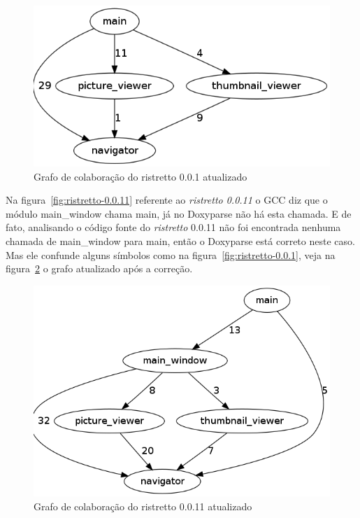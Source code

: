 \begin{figure}[h]
\center
\includegraphics[scale=0.3]{imagens/ristretto-0_0_1-doxyparse-2}
\caption{Grafo de colaboração do ristretto 0.0.1 atualizado}
\label{fig:ristretto-0.0.1-doxyparse-2}
\end{figure}

Na figura~\ref{fig:ristretto-0.0.11} referente ao {\it ristretto 0.0.11} o GCC diz que o módulo main\_window chama
main, já no Doxyparse não há esta chamada. E de fato, analisando o código fonte
do {\it ristretto} 0.0.11 não foi encontrada nenhuma chamada de main\_window para
main, então o Doxyparse está correto neste caso. Mas ele confunde alguns
símbolos como na figura~\ref{fig:ristretto-0.0.1}, veja na
figura~\ref{fig:ristretto-0.0.11-doxyparse-2} o grafo atualizado após a correção.

\begin{figure}
\center
\includegraphics[scale=0.3]{imagens/ristretto-0_0_11-doxyparse-2}
\caption{Grafo de colaboração do ristretto 0.0.11 atualizado}
\label{fig:ristretto-0.0.11-doxyparse-2}
\end{figure}

